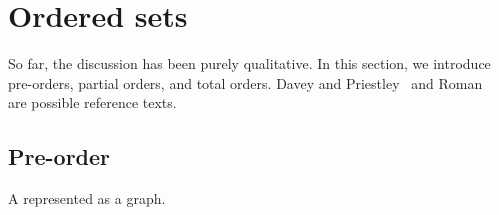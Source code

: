 
\section{Ordered sets}

\label{sec:tradeoffs-ordered-sets}


%


So far, the discussion has been purely qualitative.
In this section, we introduce pre-orders, partial orders, and total orders.
Davey and Priestley~\cite{davey02} and Roman~\cite{roman08} are possible reference texts.


\vspace{2cm}

\subsection{Pre-order}

\begin{marginfigure}
    \centering
    \caption{A  represented as a graph.}
    \label{fig:pre_order_graph}
\end{marginfigure}

